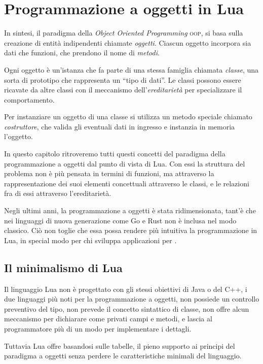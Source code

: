 
\chapter{Programmazione a oggetti in Lua}

In sintesi, il paradigma della \emph{Object Oriented Programming} \textsc{oop},
si basa sulla creazione di entità indipendenti chiamate \emph{oggetti}. Ciascun
oggetto incorpora sia dati che funzioni, che prendono il nome di \emph{metodi}.

Ogni oggetto è un'istanza che fa parte di una stessa famiglia chiamata
\emph{classe}, una sorta di prototipo che rappresenta un ``tipo di dati''. Le
classi possono essere ricavate da altre classi con il meccanismo
dell'\emph{ereditarietà} per specializzare il comportamento.

Per instanziare un oggetto di una classe si utilizza un metodo speciale chiamato
\emph{costruttore}, che valida gli eventuali dati in ingresso e instanzia in
memoria l'oggetto.

In questo capitolo ritroveremo tutti questi concetti del paradigma della
programmazione a oggetti dal punto di vista di Lua. Con essi la struttura del
problema non è più pensata in termini di funzioni, ma attraverso la
rappresentazione dei suoi elementi concettuali attraverso le classi, e le
relazioni fra di essi attraverso l'ereditarietà.

Negli ultimi anni, la programmazione a oggetti è stata ridimensionata, tant'è
che nei linguaggi di nuova generazione come Go e Rust non è inclusa nel modo
classico. Ciò non toglie che essa possa rendere più intuitiva la programmazione
in Lua, in special modo per chi sviluppa applicazioni per \LuaTeX.


\section{Il minimalismo di Lua}

Il linguaggio Lua non è progettato con gli stessi obiettivi di Java o del C++,
i due linguaggi più noti per la programmazione a oggetti, non possiede un
controllo preventivo del tipo, non prevede il concetto sintattico di
classe, non offre alcun meccanismo per dichiarare come privati campi e metodi,
e lascia al programmatore più di un modo per implementare i dettagli.

Tuttavia Lua offre basandosi sulle tabelle, il pieno supporto ai principi del
paradigma a oggetti senza perdere le caratteristiche minimali del linguaggio.



